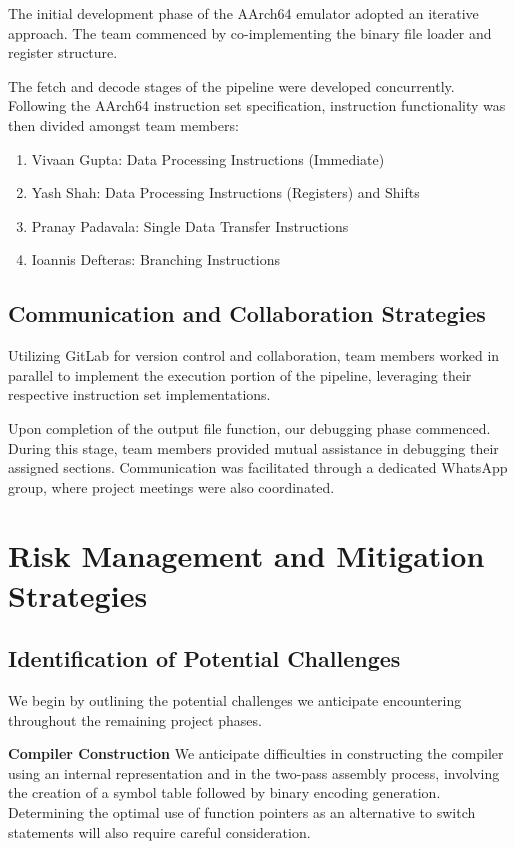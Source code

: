\documentclass[9pt,a4paper,twoside]{tau-class/tau}
\begin{document}
        The initial development phase of the AArch64 emulator adopted an iterative approach. The team commenced by co-implementing the binary file loader and register structure. 
        
        The fetch and decode stages of the pipeline were developed concurrently. Following the AArch64 instruction set specification, instruction functionality was then divided amongst team members:
        
        \begin{enumerate}
            \item Vivaan Gupta: Data Processing Instructions (Immediate)
            \item Yash Shah: Data Processing Instructions (Registers) and Shifts
            \item Pranay Padavala: Single Data Transfer Instructions
            \item Ioannis Defteras: Branching Instructions
        \end{enumerate}

    \subsection{Communication and Collaboration Strategies}

         Utilizing GitLab for version control and collaboration, team members worked in parallel to implement the execution portion of the pipeline, leveraging their respective instruction set implementations. 
         
         Upon completion of the output file function, our debugging phase commenced. During this stage, team members provided mutual assistance in debugging their assigned sections. Communication was facilitated through a dedicated WhatsApp group, where project meetings were also coordinated.

 
\section{Risk Management and Mitigation Strategies}

    \subsection{Identification of Potential Challenges}
        We begin by outlining the potential challenges we anticipate encountering throughout the remaining project phases.  
        
        \textbf{Compiler Construction }
        We anticipate difficulties in constructing the compiler using an internal representation and in the two-pass assembly process, involving the creation of a symbol table followed by binary encoding generation. Determining the optimal use of function pointers as an alternative to switch statements will also require careful consideration.  
        
\end{document}
